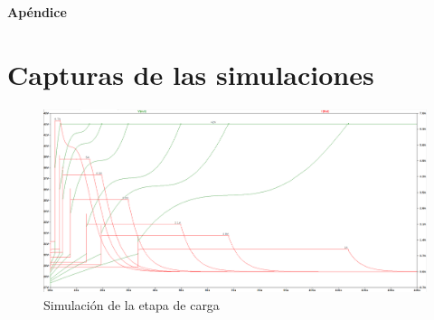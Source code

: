 \newpage
\begin{landscape}
\appendix
\begin{center}
    \bfseries\LARGE Apéndice \par
\end{center}
\section{Capturas de las simulaciones}

\begin{figure}[htb]
    \centering
    \includegraphics[width=\textwidth]{images/carga_completa_step.png}
    \caption{Simulación de la etapa de carga}
    \label{fig:simulacion_carga}
\end{figure}
\end{landscape}